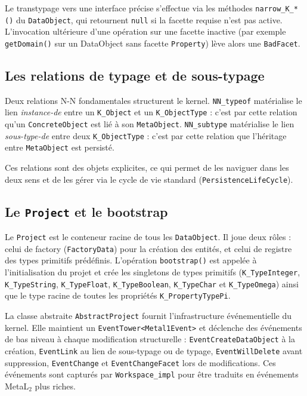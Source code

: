 Le transtypage vers une interface précise s'effectue via les méthodes
\texttt{narrow\_K\_*()} du \texttt{DataObject}, qui retournent
\texttt{null} si la facette requise n'est pas active. L'invocation
ultérieure d'une opération sur une facette inactive (par exemple
\texttt{getDomain()} sur un DataObject sans facette \texttt{Property})
lève alors une \texttt{BadFacet}.

\subsection{Les relations de typage et de sous-typage}

Deux relations N-N fondamentales structurent le kernel.
\texttt{NN\_typeof} matérialise le lien \emph{instance-de} entre un
\texttt{K\_Object} et un \texttt{K\_ObjectType} : c'est par cette
relation qu'un \texttt{ConcreteObject} est lié à son
\texttt{MetaObject}. \texttt{NN\_subtype} matérialise le lien
\emph{sous-type-de} entre deux \texttt{K\_ObjectType} : c'est par cette
relation que l'héritage entre \texttt{MetaObject} est persisté.

Ces relations sont des objets explicites, ce qui permet de les naviguer dans les deux sens et de les
gérer via le cycle de vie standard (\texttt{PersistenceLifeCycle}).

\subsection{Le \texttt{Project} et le bootstrap}

Le \texttt{Project} est le conteneur racine de tous les
\texttt{DataObject}. Il joue deux rôles : celui de factory
(\texttt{FactoryData}) pour la création des entités, et celui de registre
des types primitifs prédéfinis. L'opération \texttt{bootstrap()} est
appelée à l'initialisation du projet et crée les singletons de types
primitifs (\texttt{K\_TypeInteger}, \texttt{K\_TypeString},
\texttt{K\_TypeFloat}, \texttt{K\_TypeBoolean}, \texttt{K\_TypeChar} et
\texttt{K\_TypeOmega}) ainsi que le type racine de toutes les propriétés \texttt{K\_PropertyTypePi}.

La classe abstraite \texttt{AbstractProject} fournit l'infrastructure
événementielle du kernel. Elle maintient un \texttt{EventTower<Metal1Event>}
et déclenche des événements de bas niveau à chaque modification
structurelle : \texttt{EventCreateDataObject} à la création,
\texttt{EventLink} au lien de sous-typage ou de typage,
\texttt{EventWillDelete} avant suppression, \texttt{EventChange} et
\texttt{EventChangeFacet} lors de modifications. Ces événements sont
capturés par \texttt{Workspace\_impl} pour être traduits en événements
MetaL$_2$ plus riches.

